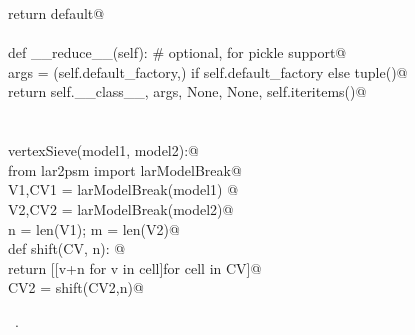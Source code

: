 \documentclass[11pt,oneside]{article}	%
\begin{document}
\begin{flushleft}
\begin{list}{}{}
\mbox{}\verb@        return default@\\
\mbox{}\verb@@\\
\mbox{}\verb@    def __reduce__(self):  # optional, for pickle support@\\
\mbox{}\verb@        args = (self.default_factory,) if self.default_factory else tuple()@\\
\mbox{}\verb@        return self.__class__, args, None, None, self.iteritems()@\\
\mbox{}\verb@@\\
\mbox{}\verb@@\\
\mbox{}\verb@def vertexSieve(model1, model2):@\\
\mbox{}\verb@   from lar2psm import larModelBreak@\\
\mbox{}\verb@   V1,CV1 = larModelBreak(model1) @\\
\mbox{}\verb@   V2,CV2 = larModelBreak(model2)@\\
\mbox{}\verb@   n = len(V1); m = len(V2)@\\
\mbox{}\verb@   def shift(CV, n): @\\
\mbox{}\verb@      return [[v+n for v in cell]for cell in CV]@\\
\mbox{}\verb@   CV2 = shift(CV2,n)@\\
\mbox{}\verb@@{\NWsep}
\end{list}
\vspace{-1ex}
\footnotesize\addtolength{\baselineskip}{-1ex}
\begin{list}{}{\setlength{\itemsep}{-\parsep}\setlength{\itemindent}{-\leftmargin}}
\item \NWtxtMacroRefIn\ .
\end{list}
\end{flushleft}
\end{document}
